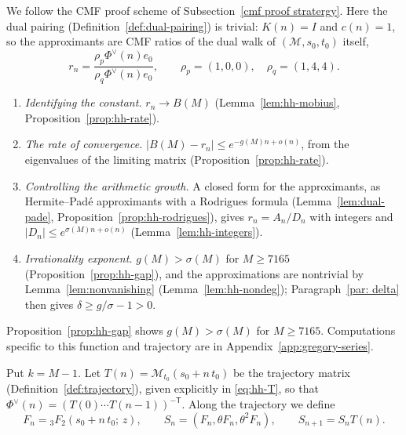 \documentclass[oneside,english,11pt]{amsart}
\begin{document}
We follow the CMF proof scheme of Subsection~\ref{cmf proof stratergy}. Here the dual pairing (Definition~\ref{def:dual-pairing}) is trivial: $K(n)=I$ and $c(n)=1$, so the approximants are CMF ratios of the dual walk of $(\mathcal M,s_0,t_0)$ itself,
\[
 r_n=\frac{\rho_p\Phi^\vee(n)e_0}{\rho_q\Phi^\vee(n)e_0},\qquad \rho_p=(1,0,0),\quad \rho_q=(1,4,4).
\]
\begin{enumerate}
 \item \emph{Identifying the constant.} $r_n\to B(M)$ (Lemma~\ref{lem:hh-mobius}, Proposition~\ref{prop:hh-rate}).
 \item \emph{The rate of convergence.} $|B(M)-r_n|\le e^{-g(M)n+o(n)}$, from the eigenvalues of the limiting matrix (Proposition~\ref{prop:hh-rate}).
 \item \emph{Controlling the arithmetic growth.} A closed form for the approximants, as Hermite--Pad\'e approximants with a Rodrigues formula (Lemma~\ref{lem:dual-pade}, Proposition~\ref{prop:hh-rodrigues}), gives $r_n=A_n/D_n$ with integers and $|D_n|\le e^{\sigma(M)n+o(n)}$ (Lemma~\ref{lem:hh-integers}).
 \item \emph{Irrationality exponent.} $g(M)>\sigma(M)$ for $M\ge7165$ (Proposition~\ref{prop:hh-gap}), and the approximations are nontrivial by Lemma~\ref{lem:nonvanishing} (Lemma~\ref{lem:hh-nondeg}); Paragraph~\ref{par: delta} then gives $\delta\ge g/\sigma-1>0$.
\end{enumerate}

Proposition~\ref{prop:hh-gap} shows $g(M)>\sigma(M)$ for $M\ge7165$. Computations specific to this function and trajectory are in Appendix~\ref{app:gregory-series}.

Put $k=M-1$.
% 
Let $T(n)=\mathcal M_{t_0}(s_0+n\,t_0)$ be the trajectory matrix (Definition~\ref{def:trajectory}), given explicitly in \eqref{eq:hh-T}, so that $\Phi^\vee(n)=(T(0)\cdots T(n-1))^{-\mathsf T}$. Along the trajectory we define
\[
  F_n={}_3F_2(s_0+n\,t_0;\,z),\qquad S_n=(F_n,\theta F_n,\theta^2F_n),\qquad S_{n+1}=S_nT(n).
\]
% 
\end{document}
